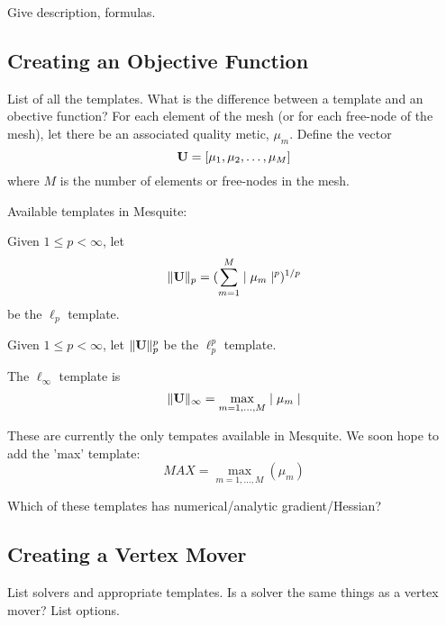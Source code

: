  \newline
Give description, formulas. 

\subsection{Creating an Objective Function}
List of all the templates. What is the difference between a template and
an obective function? For each element of the mesh (or for each 
free-node of the mesh), let there be an associated quality metic, 
$\mu_m$.  Define the vector 
\begin{equation}
{\bf U} = [ \mu_1, \mu_2, \ldots, \mu_M ]
\end{equation}
where $M$ is the number of elements or free-nodes in the mesh. \newline

\noindent Available templates in Mesquite: \newline

 \newline
Given $1 \leq p < \infty$, let
\begin{equation}
\| {\bf U} \|_p = ( \sum_{m=1}^M \mid \mu_m \mid^p )^{1/p}
\end{equation}
be the $\ell_p$ template. \newline

 \newline
Given $1 \leq p < \infty$, let $\| {\bf U} \|_p^p$ be the 
$\ell_p^p$ template. \newline

 \newline
The $\ell_{\infty}$ template is
\begin{equation}
\| {\bf U} \|_{\infty} = \max_{m=1,\ldots,M} \mid \mu_m \mid
\end{equation}

These are currently the only tempates available in Mesquite.
We soon hope to add the 'max' template:
\begin{equation}
MAX = \max_{m=1,\ldots,M} ( \mu_m )
\end{equation}

Which of these templates has numerical/analytic gradient/Hessian?

\subsection{Creating a Vertex Mover}
List solvers and appropriate templates. Is a solver the same things as a 
vertex mover? List options.


